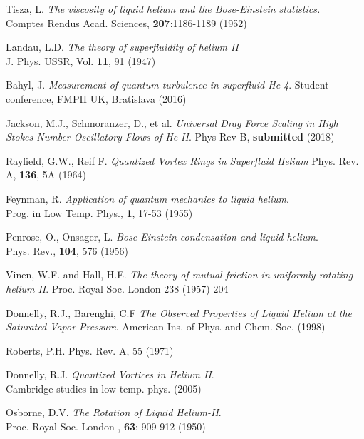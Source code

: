 
\def\bibname{Bibliography}
\begin{thebibliography}{99}
	\addcontentsline{toc}{chapter}{\bibname}

	{\sc Tisza, L.}
	\emph{The viscosity of liquid helium and the Bose-Einstein statistics.}\\
	Comptes Rendus Acad. Sciences, \textbf{207}:1186-1189 (1952)

	{\sc Landau, L.D.}
	\emph{The theory of superfluidity of helium II}\\
	J. Phys. USSR, Vol. \textbf{11}, 91 (1947)

	{\sc Bahyl, J.}
	\emph{Measurement of quantum turbulence in superfluid He-4}.
	Student conference, FMPH UK, Bratislava (2016)

	{\sc Jackson, M.J., Schmoranzer, D., et al.}
	\emph{Universal Drag Force Scaling in High Stokes Number Oscillatory Flows of He II}. Phys Rev B, \textbf{submitted} (2018)

	{\sc Rayfield, G.W., Reif F.}
	\emph{Quantized Vortex Rings in Superfluid Helium} Phys. Rev. A, \textbf{136}, 5A (1964)

	{\sc Feynman, R.}
	\emph{Application of quantum mechanics to liquid helium}.\\
	Prog. in Low Temp. Phys., \textbf{1}, 17-53 (1955)

	{\sc Penrose, O., Onsager, L.}
	\emph{Bose-Einstein condensation and liquid helium}.\\
	Phys. Rev., \textbf{104}, 576 (1956)

	{\sc Vinen, W.F.} and {\sc Hall, H.E.}
	\emph{The theory of mutual friction in uniformly rotating helium II}.
	Proc. Royal Soc. London 238 (1957) 204

	{\sc Donnelly, R.J., Barenghi, C.F}
	\emph{The Observed Properties of Liquid Helium at the Saturated Vapor Pressure}. American Ins. of Phys. and Chem. Soc. (1998)

	{\sc Roberts, P.H.}
	\emph{} Phys. Rev. A, 55 (1971)

	{\sc Donnelly, R.J.}
	\emph{Quantized Vortices in Helium II}.\\
	Cambridge studies in low temp. phys. (2005)

	{\sc Osborne, D.V.}
	\emph{The Rotation of Liquid Helium-II}.\\
	Proc. Royal Soc. London , \textbf{63}: 909-912 (1950)


\end{thebibliography}
